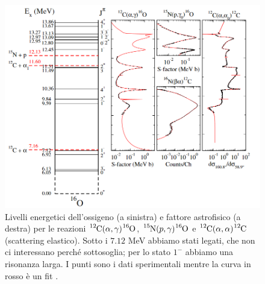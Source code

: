 \begin{figure}[!h]
	\centering
	\includegraphics[scale=0.6]{Immagini/0426_lv.png}
	\caption{Livelli energetici dell'ossigeno (a sinistra) e fattore astrofisico (a destra) per le reazioni $\ce{^{12}C}(\alpha,\gamma)\ce{^{16}O}$, $\ce{^{15}N}(p,\gamma)\ce{^{16}O}$ e $\ce{^{12}C}(\alpha,\alpha)\ce{^{12}C}$ (scattering elastico). Sotto i $7.12$ MeV abbiamo stati legati, che non ci interessano perché sottosoglia; per lo stato $1^-$ abbiamo una risonanza larga. I punti sono i dati sperimentali mentre la curva in rosso è un fit .}
	\label{0426_lv}
\end{figure}

